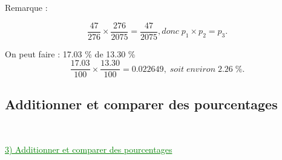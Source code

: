 \documentclass[xcolor={dvipsnames}]{beamer}
\begin{document}
\begin{frame}{}
		\begin{block}{Remarque :}
		
		\begin{equation*}
		\dfrac{47}{276}  \times \dfrac{276}{2075} = \dfrac{47}{2075}, donc \; p_1 \times p_2 = p_3.
		\end{equation*}
		
		
		On peut faire : \num{17.03} \% de \num{13.30} \%
		\begin{equation*}
		\dfrac{\num{17.03}}{100} \times \dfrac{\num{13.30}}{100} = \num{0.022649}, \; soit \; environ \; \num{2.26}\; \%.
		\end{equation*}	
	\end{block}
\end{frame}

\subsection{Additionner et comparer des pourcentages}

\begin{frame}
\

%

\textcolor{Green}{\underline{3) Additionner et comparer des pourcentages}}
\end{frame}
\end{document}
